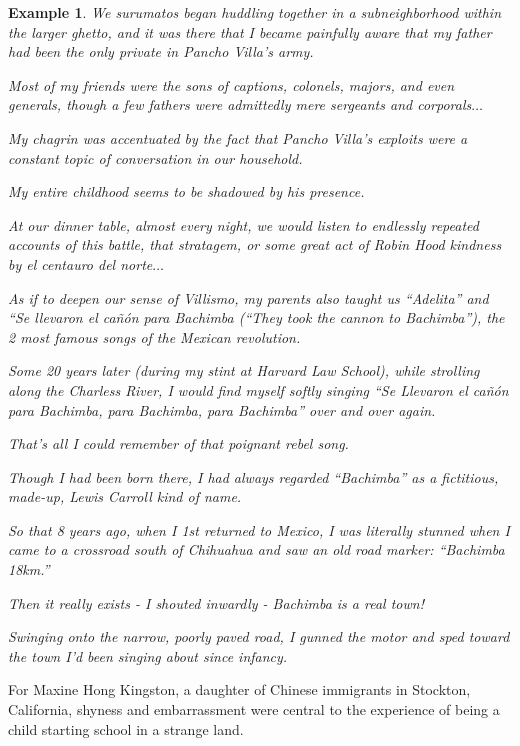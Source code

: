 \documentclass{book}
\numberwithin{equation}{section}
\newtheorem{example}{Example}[chapter]
\begin{document}
\begin{example}
    We \textit{surumatos} began huddling together in a subneighborhood within the larger ghetto, and it was there that I became painfully aware that my father had been the only private in Pancho Villa's army.
    
    Most of my friends were the sons of captions, colonels, majors, and even generals, though a few fathers were admittedly mere sergeants and corporals$\ldots$
    
    My chagrin was accentuated by the fact that Pancho Villa's exploits were a constant topic of conversation in our household.
    
    My entire childhood seems to be shadowed by his presence.
    
    At our dinner table, almost every night, we would listen to endlessly repeated accounts of this battle, that stratagem, or some great act of Robin Hood kindness by \textit{el centauro del norte}$\ldots$
    
    As if to deepen our sense of \textit{Villismo}, my parents also taught us ``Adelita'' and ``\textit{Se llevaron el ca\~{n}\'on para Bachimba} (``They took the cannon to Bachimba''), the 2 most famous songs of the Mexican revolution.
    
    Some 20 years later (during my stint at Harvard Law School), while strolling along the Charless River, I would find myself softly singing ``\textit{Se Llevaron el ca\~{n}\'on para Bachimba, para Bachimba, para Bachimba}'' over and over again.
    
    That's all I could remember of that poignant rebel song.
    
    Though I had been born there, I had always regarded ``Bachimba'' as a fictitious, made-up, Lewis Carroll kind of name.
    
    So that 8 years ago, when I 1st returned to Mexico, I was literally stunned when I came to a crossroad south of Chihuahua and saw an old road marker: ``Bachimba 18km.''
    
    Then it really exists - I shouted inwardly - Bachimba is a real town!
    
    Swinging onto the narrow, poorly paved road, I gunned the motor and sped toward the town I'd been singing about since infancy.
\end{example}
For Maxine Hong Kingston, a daughter of Chinese immigrants in Stockton, California, shyness and embarrassment were central to the experience of being a child starting school in a strange land.
\end{document}
